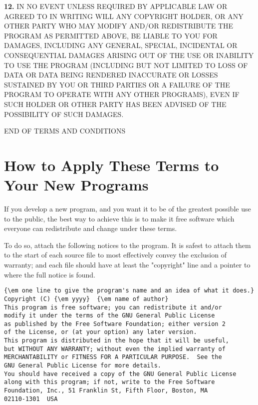 {\bf 12.} IN NO EVENT UNLESS REQUIRED BY APPLICABLE LAW OR AGREED TO IN
WRITING WILL ANY COPYRIGHT HOLDER, OR ANY OTHER PARTY WHO MAY MODIFY AND/OR
REDISTRIBUTE THE PROGRAM AS PERMITTED ABOVE, BE LIABLE TO YOU FOR DAMAGES,
INCLUDING ANY GENERAL, SPECIAL, INCIDENTAL OR CONSEQUENTIAL DAMAGES ARISING
OUT OF THE USE OR INABILITY TO USE THE PROGRAM (INCLUDING BUT NOT LIMITED TO
LOSS OF DATA OR DATA BEING RENDERED INACCURATE OR LOSSES SUSTAINED BY YOU OR
THIRD PARTIES OR A FAILURE OF THE PROGRAM TO OPERATE WITH ANY OTHER PROGRAMS),
EVEN IF SUCH HOLDER OR OTHER PARTY HAS BEEN ADVISED OF THE POSSIBILITY OF SUCH
DAMAGES.

END OF TERMS AND CONDITIONS

\section{How to Apply These Terms to Your New Programs}
\label{SEC4}

If you develop a new program, and you want it to be of the greatest possible
use to the public, the best way to achieve this is to make it free software
which everyone can redistribute and change under these terms.

To do so, attach the following notices to the program. It is safest to attach
them to the start of each source file to most effectively convey the exclusion
of warranty; and each file should have at least the "copyright" line and a
pointer to where the full notice is found.

\footnotesize
\begin{verbatim}
{\em one line to give the program's name and an idea of what it does.}
Copyright (C) {\em yyyy}  {\em name of author}
This program is free software; you can redistribute it and/or
modify it under the terms of the GNU General Public License
as published by the Free Software Foundation; either version 2
of the License, or (at your option) any later version.
This program is distributed in the hope that it will be useful,
but WITHOUT ANY WARRANTY; without even the implied warranty of
MERCHANTABILITY or FITNESS FOR A PARTICULAR PURPOSE.  See the
GNU General Public License for more details.
You should have received a copy of the GNU General Public License
along with this program; if not, write to the Free Software
Foundation, Inc., 51 Franklin St, Fifth Floor, Boston, MA
02110-1301  USA
\end{verbatim}
\normalsize

